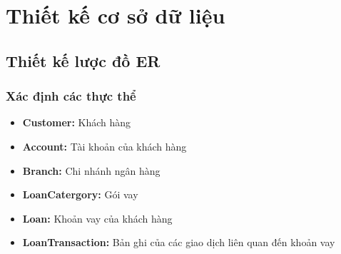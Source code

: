 \documentclass{article}
\begin{document}
\section{Thiết kế cơ sở dữ liệu}
\subsection{Thiết kế lược đồ ER}
\subsubsection{Xác định các thực thể}
\begin{itemize}
    \item \textbf{Customer:} Khách hàng
    \item \textbf{Account:} Tài khoản của khách hàng
    \item \textbf{Branch:} Chi nhánh ngân hàng
    \item \textbf{LoanCatergory:} Gói vay
    \item \textbf{Loan:} Khoản vay của khách hàng
    \item \textbf{LoanTransaction:} Bản ghi của các giao dịch liên quan đến khoản vay
\end{itemize}
\end{document}
